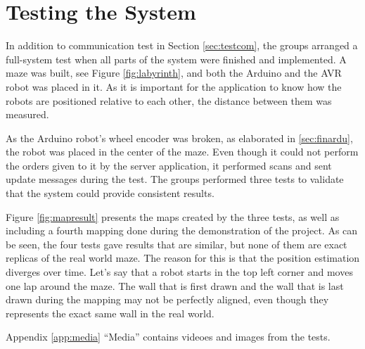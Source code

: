 \chapter{Testing the System}
In addition to communication test in Section \ref{sec:testcom}, the groups arranged a full-system test when all parts of the system were finished and implemented. A maze was built, see Figure \ref{fig:labyrinth}, and both the Arduino and the AVR robot was placed in it. As it is important for the application to know how the robots are positioned relative to each other, the distance between them was measured.


As the Arduino robot's wheel encoder was broken, as elaborated in \ref{sec:finardu}, the robot was placed in the center of the maze. Even though it could not perform the orders given to it by the server application, it performed scans and sent update messages during the test. The groups performed three tests to validate that the system could provide consistent results.

Figure \ref{fig:mapresult} presents the maps created by the three tests, as well as including a fourth mapping done during the demonstration of the project. As can be seen, the four tests gave results that are similar, but none of them are exact replicas of the real world maze. The reason for this is that the position estimation diverges over time. Let's say that a robot starts in the top left corner and moves one lap around the maze. The wall that is first drawn and the wall that is last drawn during the mapping may not be perfectly aligned, even though they represents the exact same wall in the real world.

Appendix \ref{app:media} ``Media'' contains videoes and images from the tests.


